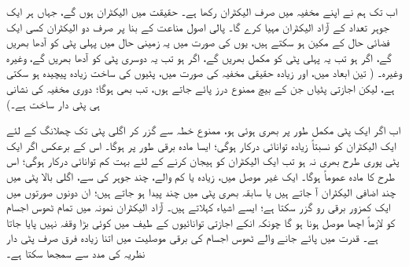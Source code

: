   اب تک ہم نے  اپنے مخفیہ میں صرف  الیکٹران رکھا ہے۔ حقیقت میں  الیکٹران ہوں گے،  جہاں ہر ایک جوہر  تعداد کے آزاد الیکٹران مہیا  کرے گا۔ پالی اصول مناعت کے بنا پر صرف دو الیکٹران کسی ایک فضائی حال کے مکین ہو سکتے ہیں،  یوں   کی صورت میں یہ زمینی حال میں پہلی پٹی کو آدھا   بھریں گے،  اگر   ہو تب یہ پہلی پٹی کو مکمل  بھریں  گے،  اگر  ہو تب  یہ دوسری پٹی کو آدھا بھریں گے، وغیرہ وغیرہ۔ ( تین ابعاد میں،  اور زیادہ حقیقی مخفیہ کی صورت میں،  پٹیوں کی ساخت زیادہ پیچیدہ ہو سکتی ہے،  لیکن اجازتی پٹیاں جن کے بیچ ممنوع درز پائے جاتے ہوں،  تب بھی ہوگا؛  دوری مخفیہ کی نشانی  ہی  پٹی دار ساخت  ہے۔)
 
 اب اگر ایک پٹی مکمل طور پر بھری ہوئی ہو،  ممنوع خطہ سے گزر کر  اگلی پٹی تک چھلانگ کے لئے ایک الیکٹران کو نسبتاً زیادہ توانائی درکار ہوگی؛   ایسا مادہ برقی طور پر    ہوگا۔ اس کے برعکس اگر ایک پٹی پوری طرح بھری  نہ ہو  تب ایک الیکٹران  کو ہیجان کرنے کے لئے بہت کم  توانائی درکار ہوگی؛   اس طرح کا مادہ عموماً   ہوگا۔ ایک غیر موصل میں،  زیادہ  یا کم  والے،  چند جوہر کی  سے،  اگلی بالا  پٹی میں چند اضافی الیکٹران آ  جاتے ہیں یا   سابقہ بھری پٹی   میں چند    پیدا ہو  جاتے ہیں؛  ان دونوں صورتوں میں ایک کمزور برقی رو گزر سکتا ہے؛ ایسے اشیاء    کہلاتے ہیں۔ آزاد الیکٹران نمونہ میں تمام ٹھوس اجسام کو لازماً  اچھا  موصل ہونا  ہو گا چونکہ انکے اجازتی توانائیوں کے طیف میں کوئی بڑا وقفہ نہیں پایا جاتا ہے۔ قدرت میں پائے جانے والے ٹھوس اجسام کی برقی موصلیت میں اتنا زیادہ فرق صرف پٹی دار  نظریہ  کی مدد سے سمجھا سکتا ہے۔  

